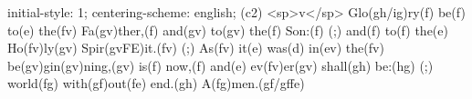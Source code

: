 initial-style: 1;
centering-scheme: english;
(c2) <sp>v</sp> Glo(gh/ig)ry(f) be(f) to(e) the(fv) Fa(gv)ther,(f) and(gv) to(gv) the(f) Son:(f) (;) and(f) to(f) the(e) Ho(fv)ly(gv) Spir(gvFE)it.(fv) (;) As(fv) it(e) was(d) in(ev) the(fv) be(gv)gin(gv)ning,(gv) is(f) now,(f) and(e) ev(fv)er(gv) shall(gh) be:(hg) (;) world(fg) with(gf)out(fe) end.(gh) A(fg)men.(gf/gffe)
